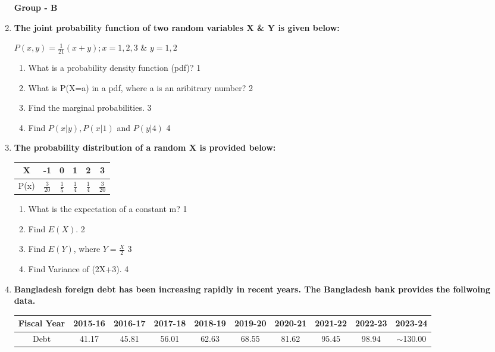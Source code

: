\documentclass[12pt]{article}
\begin{document}
\begin{enumerate}
\begin{center}
\textbf{Group  - B}
\end{center}
  
   \item
	  \textbf{The joint probability function of two random variables X \& Y is given below:}

\begin{center}
$P(x,y) = \frac{1}{21}(x+y); x=1,2,3$ \& $y = 1,2$ 
\end{center}
  
  \begin{enumerate}
    \item
	What is a probability density function (pdf)? \hfill 1
    \item
	What is P(X=a) in a pdf, where a is an aribitrary number? \hfill 2
    \item  
	Find the marginal probabilities. \hfill 3
    \item
	Find $P(x \vert y), P(x \vert 1)$ and $P(y|4)$ \hfill 4
  \end{enumerate}
  
     \item
	  \textbf{The probability distribution of a random X is provided below:} 
	  
	  \begin{table}[h]
	  \centering
\begin{tabular}{c|ccccc}
X & -1 & 0 & 1 & 2 & 3 \\ \hline
P(x) & $\frac 3{20}$ & $\frac 15$ & $\frac 14$ & $\frac 14$ & $\frac 3{20}$
\end{tabular}
\end{table}
  
  \begin{enumerate}
    \item
	What is the expectation of a constant m? \hfill 1
    \item
	Find $E(X).$ \hfill 2
    \item  
	Find $E(Y)$, where $Y = \frac X2$  \hfill 3
    \item
	Find Variance of (2X+3). \hfill 4
  \end{enumerate}

     \item
	  \textbf{Bangladesh foreign debt has been increasing rapidly in recent years. The Bangladesh bank provides the follwoing data.}
	  
	  \begin{table}[H]
	  \centering
\begin{tabular}{c|c|c|c|c|c|c|c|c|c}
Fiscal Year & 2015-16 & 2016-17 & 2017-18 & 2018-19 & 2019-20 & 2020-21 & 2021-22 & 2022-23 & 2023-24 \\ \hline
Debt & 41.17 & 45.81 & 56.01 & 62.63 & 68.55 & 81.62 & 95.45 & 98.94 & $\sim$130.00
\end{tabular}
\end{table}
  

\end{enumerate}
\end{document}
